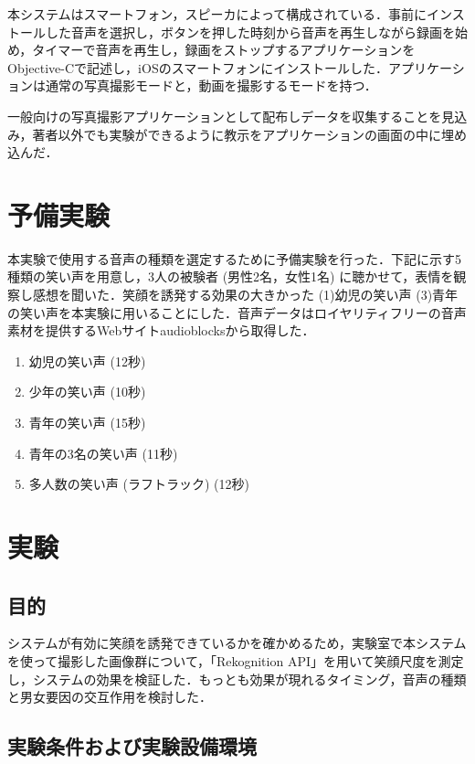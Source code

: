 \documentclass[submit,techreq]{ec2014}
\begin{document}
本システムはスマートフォン，スピーカによって構成されている．事前にインストールした音声を選択し，ボタンを押した時刻から音声を再生しながら録画を始め，タイマーで音声を再生し，録画をストップするアプリケーションをObjective-Cで記述し，iOSのスマートフォンにインストールした．アプリケーションは通常の写真撮影モードと，動画を撮影するモードを持つ．

一般向けの写真撮影アプリケーションとして配布しデータを収集することを見込み，著者以外でも実験ができるように教示をアプリケーションの画面の中に埋め込んだ．


\section{予備実験}

本実験で使用する音声の種類を選定するために予備実験を行った．下記に示す5種類の笑い声を用意し，3人の被験者 (男性2名，女性1名) に聴かせて，表情を観察し感想を聞いた．笑顔を誘発する効果の大きかった (1)幼児の笑い声 (3)青年の笑い声を本実験に用いることにした．音声データはロイヤリティフリーの音声素材を提供するWebサイトaudioblocks\cite{AudioBlocks}から取得した．

\begin{enumerate}
 \item 幼児の笑い声 (12秒)
 \item 少年の笑い声 (10秒)
 \item 青年の笑い声 (15秒)
 \item 青年の3名の笑い声 (11秒)
 \item 多人数の笑い声 (ラフトラック) (12秒)
\end{enumerate}

\section{実験}

\subsection{目的}

システムが有効に笑顔を誘発できているかを確かめるため，実験室で本システムを使って撮影した画像群について，「Rekognition API」を用いて笑顔尺度を測定し，システムの効果を検証した．もっとも効果が現れるタイミング，音声の種類と男女要因の交互作用を検討した．

\subsection{実験条件および実験設備環境}
\end{document}
